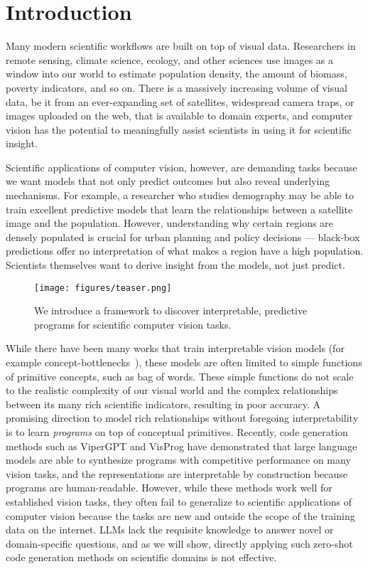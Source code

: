 \section{Introduction}
\label{sec:intro}

Many modern scientific workflows are built on top of visual data. 
Researchers in remote sensing, climate science, ecology, and other sciences use images as a window into our world to estimate population density, the amount of biomass, poverty indicators, and so on. There is a massively increasing volume of visual data, be it from an ever-expanding set of satellites, widespread camera traps, or images uploaded on the web, that is available to domain experts, and computer vision has the potential to meaningfully assist scientists in using it for scientific insight.

Scientific applications of computer vision, however, are demanding tasks because we want models that not only predict outcomes but also reveal underlying mechanisms. For example, a researcher who studies demography may be able to train excellent predictive models that learn the relationships between a satellite image and the population.
However, understanding why certain regions are densely populated is crucial for urban planning and policy decisions --- black-box predictions offer no interpretation of what makes a region have a high population. 
Scientists themselves want to derive insight from the models, not just predict.

\begin{figure}[t!]
    \centering
\texttt{[image: figures/teaser.png]} %
\caption{We introduce a framework to discover interpretable, predictive programs for scientific computer vision tasks.}
\label{fig:teaser}
\end{figure}


While there have been many works that train interpretable vision models (for example concept-bottlenecks~\citep{koh20concept,menon2022visual}), these models are often limited to simple functions of primitive concepts, such as bag of words.
These simple functions do not scale to the realistic complexity of our visual world and the complex relationships between its many rich scientific indicators, resulting in poor accuracy. 
A promising direction to model rich relationships without foregoing interpretability is to learn \emph{programs} on top of conceptual primitives.
Recently, code generation methods such as ViperGPT and VisProg \cite{suris-23,gupta2023visual} have demonstrated that large language models are able to synthesize programs with competitive performance on many vision tasks, and the representations are interpretable by construction because programs are human-readable. However, while these methods work well for established vision tasks, they often fail to generalize to scientific applications of computer vision because the tasks are new and outside the scope of the training data on the internet. LLMs lack the requisite knowledge to answer novel or domain-specific questions, and as we will show, directly applying such zero-shot code generation methods on scientific domains is not effective.


